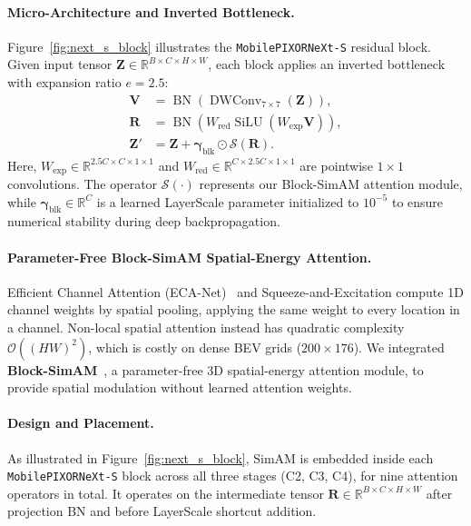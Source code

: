 \paragraph{Micro-Architecture and Inverted Bottleneck.}
Figure~\ref{fig:next_s_block} illustrates the \texttt{MobilePIXORNeXt-S} residual block. Given input tensor $\mathbf{Z} \in \mathbb{R}^{B \times C \times H \times W}$, each block applies an inverted bottleneck with expansion ratio $e = 2.5$:
\begin{align}
    \mathbf{V} &= \operatorname{BN}(\operatorname{DWConv}_{7\times7}(\mathbf{Z})),\nonumber\\
    \mathbf{R} &= \operatorname{BN}\left(W_{\mathrm{red}} \operatorname{SiLU}(W_{\mathrm{exp}}\mathbf{V})\right),\nonumber\\
    \mathbf{Z}' &= \mathbf{Z} + \boldsymbol{\gamma}_{\mathrm{blk}} \odot \mathcal{S}(\mathbf{R}).
    \label{eq:next_block}
\end{align}
Here, $W_{\mathrm{exp}} \in \mathbb{R}^{2.5C \times C \times 1 \times 1}$ and $W_{\mathrm{red}} \in \mathbb{R}^{C \times 2.5C \times 1 \times 1}$ are pointwise $1 \times 1$ convolutions. The operator $\mathcal{S}(\cdot)$ represents our Block-SimAM attention module, while $\boldsymbol{\gamma}_{\mathrm{blk}} \in \mathbb{R}^C$ is a learned LayerScale parameter initialized to $10^{-5}$ to ensure numerical stability during deep backpropagation.

\paragraph{Parameter-Free Block-SimAM Spatial-Energy Attention.}
Efficient Channel Attention (ECA-Net)~\cite{wang2020eca} and Squeeze-and-Excitation compute 1D channel weights by spatial pooling, applying the same weight to every location in a channel. Non-local spatial attention instead has quadratic complexity $\mathcal{O}((HW)^2)$, which is costly on dense BEV grids ($200 \times 176$). We integrated \textbf{Block-SimAM}~\cite{yang2021simam}, a parameter-free 3D spatial-energy attention module, to provide spatial modulation without learned attention weights.

\paragraph{Design and Placement.}
As illustrated in Figure~\ref{fig:next_s_block}, SimAM is embedded inside each \texttt{MobilePIXORNeXt-\allowbreak S} block across all three stages (C2, C3, C4), for nine attention operators in total. It operates on the intermediate tensor $\mathbf{R} \in \mathbb{R}^{B \times C \times H \times W}$ after projection BN and before LayerScale shortcut addition.

